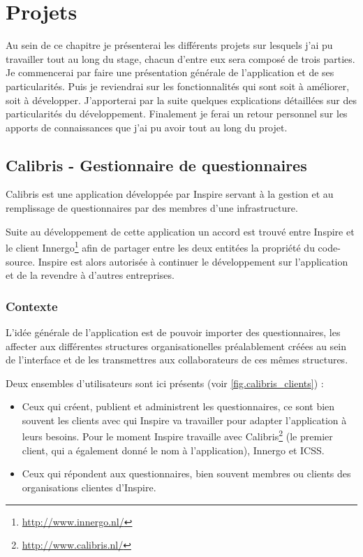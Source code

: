 \documentclass[12pt,a4paper]{book}
\begin{document}
\chapter{Projets}

Au sein de ce chapitre je présenterai les différents projets sur lesquels j'ai pu travailler tout au long du stage, chacun d'entre eux sera composé de trois parties. Je commencerai par faire une présentation générale de l'application et de ses particularités. Puis je reviendrai sur les fonctionnalités qui sont soit à améliorer, soit à développer. J'apporterai par la suite quelques explications détaillées sur des particularités du développement. Finalement je ferai un retour personnel sur les apports de connaissances que j'ai pu avoir tout au long du projet.

\section{Calibris - Gestionnaire de questionnaires}

\label{section.gestionnaire_questionnaire_dev}

\label{sec:calibris}
Calibris est une application développée par Inspire servant à la gestion et au remplissage de questionnaires par des membres d'une infrastructure.

Suite au développement de cette application un accord est trouvé entre Inspire et le client Innergo\footnote{\url{http://www.innergo.nl/}} afin de partager entre les deux entitées la propriété du code-source. Inspire est alors autorisée à continuer le développement sur l'application et de la revendre à d'autres entreprises.

\subsection{Contexte}

L'idée générale de l'application est de pouvoir importer des questionnaires, les affecter aux différentes structures organisationelles préalablement créées au sein de l'interface et de les transmettres aux collaborateurs de ces mêmes structures. 

Deux ensembles d'utilisateurs sont ici présents (voir \cref{fig.calibris_clients}) :
\begin{itemize}
  \item Ceux qui créent, publient et administrent les questionnaires, ce sont bien souvent les clients avec qui Inspire va travailler pour adapter l'application à leurs besoins. Pour le moment Inspire travaille avec Calibris\footnote{\url{http://www.calibris.nl/}} (le premier client, qui a également donné le nom à l'application), Innergo et ICSS.
  \item Ceux qui répondent aux questionnaires, bien souvent membres ou clients des organisations clientes d'Inspire. 
\end{itemize}
\end{document}
